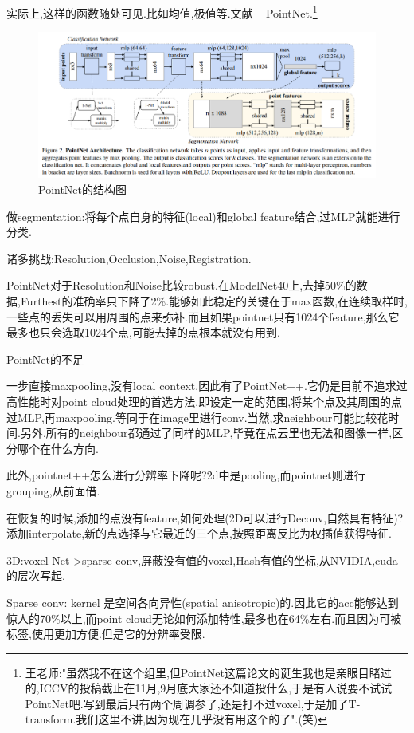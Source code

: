 	实际上,这样的函数随处可见.比如均值,极值等.文献 ~\cite{PointNet} PointNet.\footnote{王老师:"虽然我不在这个组里,但PointNet这篇论文的诞生我也是亲眼目睹过的,ICCV的投稿截止在11月,9月底大家还不知道投什么,于是有人说要不试试PointNet吧.写到最后只有两个周调参了,还是打不过voxel,于是加了T-transform.我们这里不讲,因为现在几乎没有用这个的了".(笑)}
	\begin{figure}[htbp]
		\centering
		\includegraphics[scale=0.6]{figures/PointNet.png}
		\caption{PointNet的结构图}
		\label{}
	\end{figure}

	做segmentation:将每个点自身的特征(local)和global feature结合,过MLP就能进行分类.
	
	诸多挑战:Resolution,Occlusion,Noise,Registration.
	
	PointNet对于Resolution和Noise比较robust.在ModelNet40上,去掉50\%的数据,Furthest的准确率只下降了2\%.能够如此稳定的关键在于max函数,在连续取样时,一些点的丢失可以用周围的点来弥补.而且如果pointnet只有1024个feature,那么它最多也只会选取1024个点,可能去掉的点根本就没有用到.
	
	PointNet的不足
	
	一步直接maxpooling,没有local context.因此有了PointNet++.它仍是目前不追求过高性能时对point cloud处理的首选方法.即设定一定的范围,将某个点及其周围的点过MLP,再maxpooling.等同于在image里进行conv.当然,求neighbour可能比较花时间.另外,所有的neighbour都通过了同样的MLP,毕竟在点云里也无法和图像一样,区分哪个在什么方向.
	
	此外,pointnet++怎么进行分辨率下降呢?2d中是pooling,而pointnet则进行grouping,从前面借.
	
	在恢复的时候,添加的点没有feature,如何处理(2D可以进行Deconv,自然具有特征)?添加interpolate,新的点选择与它最近的三个点,按照距离反比为权插值获得特征.
	
	3D:voxel Net->sparse conv,屏蔽没有值的voxel,Hash有值的坐标,从NVIDIA,cuda的层次写起.
	
	Sparse conv: kernel 是空间各向异性(spatial anisotropic)的.因此它的acc能够达到惊人的70\%以上,而point cloud无论如何添加特性,最多也在64\%左右.而且因为可被标签,使用更加方便.但是它的分辨率受限.
	
